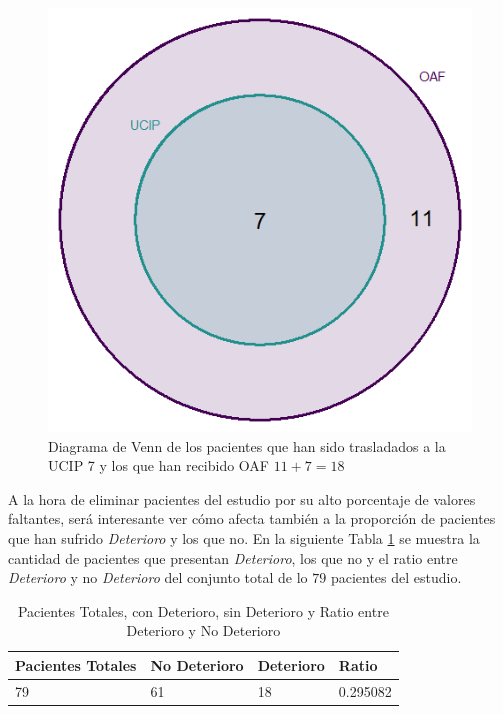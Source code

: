 \begin{figure}[H]
    \centering
    \includegraphics[scale = 1.50]{./img/venn-diagram-OAF-UCIP.png}
    \caption{Diagrama de Venn de los pacientes que han sido trasladados a la UCIP 7 y los que han recibido OAF $11 + 7 = 18$}
    \label{fig:venn-OAF-UCIP}
\end{figure}


A la hora de eliminar pacientes del estudio por su alto porcentaje de valores faltantes, será interesante ver cómo afecta también a la proporción de pacientes que han sufrido \textit{Deterioro} y los que no. En la siguiente Tabla \ref{tabla:ratio-deterioro} se muestra la cantidad de pacientes que presentan \textit{Deterioro}, los que no y el ratio entre \textit{Deterioro} y no \textit{Deterioro} del conjunto total de lo $79$ pacientes del estudio.

\begin{table}[H]
    \centering
    \begin{tabular}{|m{2cm}|m{2.25cm}|m{2cm}|m{2cm}|}
    \hline
        Pacientes Totales & No Deterioro & Deterioro & Ratio \\ \hline
        79 & 61 & 18 & 0.295082 \\ \hline
    \end{tabular}
    \caption{Pacientes Totales, con Deterioro, sin Deterioro y Ratio entre Deterioro y No Deterioro}
        \label{tabla:ratio-deterioro}
\end{table}

